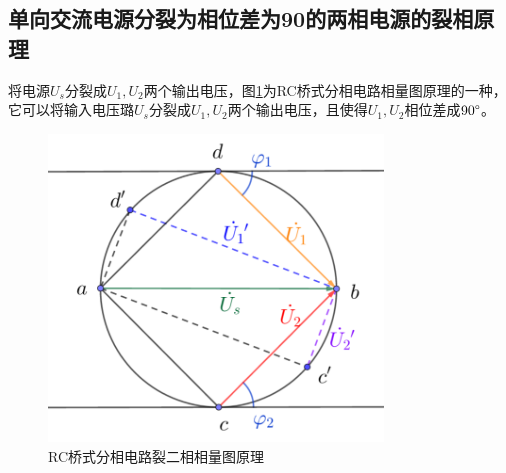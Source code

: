 \documentclass[12pt]{article}%
\begin{document}
\subsection{单向交流电源分裂为相位差为90\degree 的两相电源的裂相原理}
将电源$U_s$分裂成$U_1,U_2$两个输出电压，图\ref{fig:1}为RC桥式分相电路相量图原理的一种，它可以将输入电压璐$U_s$分裂成$U_1,U_2$两个输出电压，且使得$U_1,U_2$相位差成$90\degree$。
\begin{figure}[htbp]
\centering\includegraphics[width=3.5in]{TIM20180531102852.png}
\caption{\heiti{}RC桥式分相电路裂二相相量图原理}\label{fig:1}
\end{figure}
\end{document}
